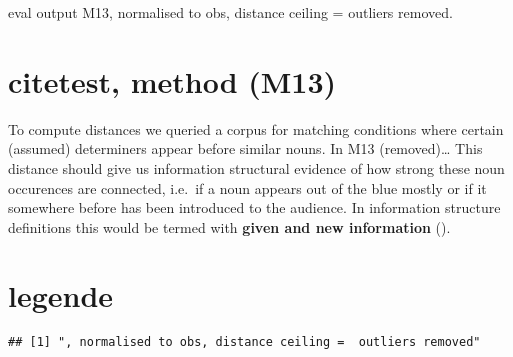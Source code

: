 \documentclass[
  12pt,
  oneside]{book}
\begin{document}
eval output M13, normalised to obs, distance ceiling = outliers removed.

\section{citetest, method (M13)}\label{citetest-method-m13}

To compute distances we queried a corpus for matching conditions where certain (assumed) determiners appear before similar nouns. In M13 (removed)\ldots{} This distance should give us information structural evidence of how strong these noun occurences are connected, i.e.~if a noun appears out of the blue mostly or if it somewhere before has been introduced to the audience. In information structure definitions this would be termed with \textbf{given and new information} ().

\section{legende}\label{legende}

\begin{verbatim}
## [1] ", normalised to obs, distance ceiling =  outliers removed"
\end{verbatim}
\end{document}
